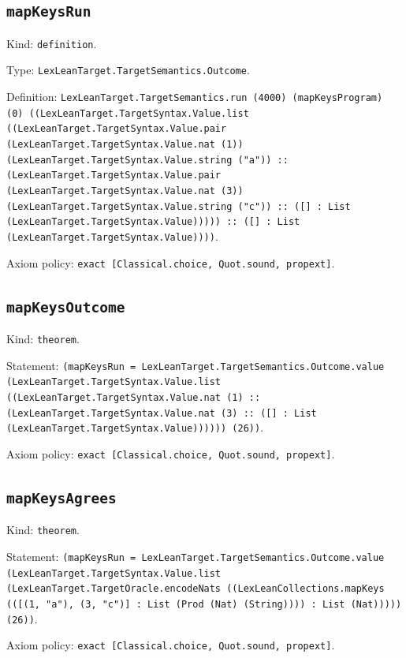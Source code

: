 \documentclass[11pt]{article}
\begin{document}
\subsection*{\texttt{mapKeysRun}}
\noindent Kind: \texttt{definition}.\par
\noindent Type: \texttt{LexLeanTarget.TargetSemantics.Outcome}.\par
\noindent Definition: \texttt{LexLeanTarget.TargetSemantics.run (4000) (mapKeysProgram) (0) ((LexLeanTarget.TargetSyntax.Value.list ((LexLeanTarget.TargetSyntax.Value.pair (LexLeanTarget.TargetSyntax.Value.nat (1)) (LexLeanTarget.TargetSyntax.Value.string ("a")) :: (LexLeanTarget.TargetSyntax.Value.pair (LexLeanTarget.TargetSyntax.Value.nat (3)) (LexLeanTarget.TargetSyntax.Value.string ("c")) :: ([] : List (LexLeanTarget.TargetSyntax.Value))))) :: ([] : List (LexLeanTarget.TargetSyntax.Value))))}.\par
\noindent Axiom policy: \texttt{exact [Classical.choice, Quot.sound, propext]}.\par
\subsection*{\texttt{mapKeysOutcome}}
\noindent Kind: \texttt{theorem}.\par
\noindent Statement: \texttt{(mapKeysRun = LexLeanTarget.TargetSemantics.Outcome.value (LexLeanTarget.TargetSyntax.Value.list ((LexLeanTarget.TargetSyntax.Value.nat (1) :: (LexLeanTarget.TargetSyntax.Value.nat (3) :: ([] : List (LexLeanTarget.TargetSyntax.Value)))))) (26))}.\par
\noindent Axiom policy: \texttt{exact [Classical.choice, Quot.sound, propext]}.\par
\subsection*{\texttt{mapKeysAgrees}}
\noindent Kind: \texttt{theorem}.\par
\noindent Statement: \texttt{(mapKeysRun = LexLeanTarget.TargetSemantics.Outcome.value (LexLeanTarget.TargetSyntax.Value.list (LexLeanTarget.TargetOracle.encodeNats ((LexLeanCollections.mapKeys (([(1, "a"), (3, "c")] : List (Prod (Nat) (String)))) : List (Nat))))) (26))}.\par
\noindent Axiom policy: \texttt{exact [Classical.choice, Quot.sound, propext]}.\par
\end{document}
